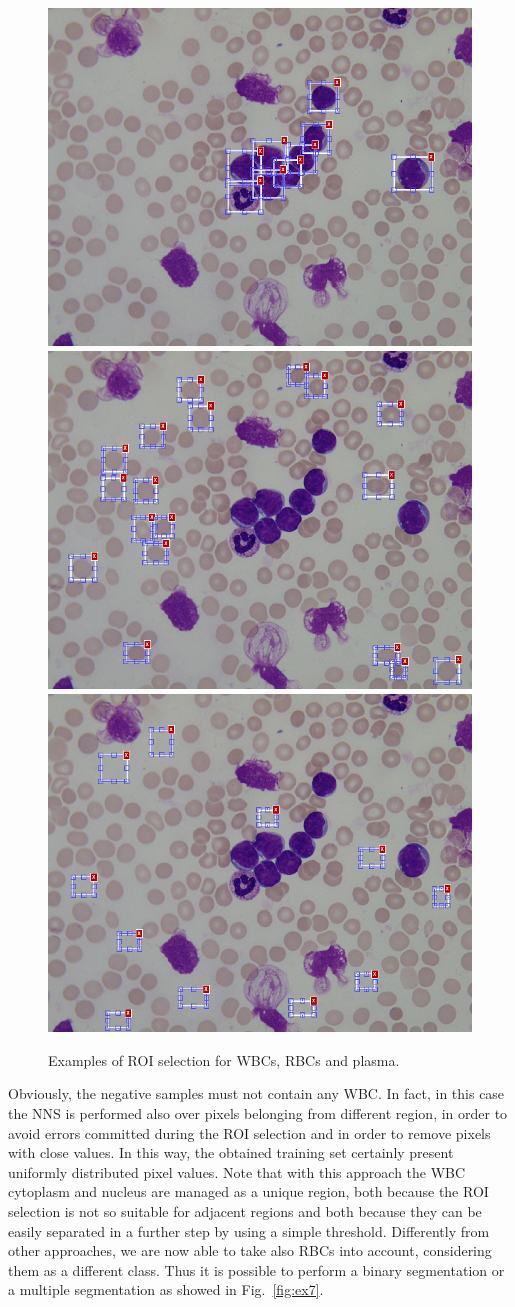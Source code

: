 \documentclass[final,a4paper,12pt,english]{UnicaPhdThesis3}
\begin{document}
\begin{figure}[!b]
	\centering
	\includegraphics[height=0.25\textwidth]{images/2015_1_caip/ROI1}
	\includegraphics[height=0.25\textwidth]{images/2015_1_caip/ROI2}
	\includegraphics[height=0.25\textwidth]{images/2015_1_caip/ROI3}
	\caption{\label{fig:ex6}Examples of ROI selection for WBCs, RBCs and plasma.}
\end{figure}

Obviously, the negative samples must not contain any WBC. In fact, in this case the NNS is performed also over pixels belonging from different region, in order to avoid errors committed during the ROI selection and in order to remove pixels with close values. In this way, the obtained training set certainly present uniformly distributed pixel values. Note that with this approach the WBC cytoplasm and nucleus are managed as a unique region, both because the ROI selection is not so suitable for adjacent regions and both because they can be easily separated in a further step by using a simple threshold. Differently from other approaches, we are now able to take also RBCs into account, considering them as a different class.
Thus it is possible to perform a binary segmentation or a multiple segmentation as showed in Fig.~\ref{fig:ex7}.
\end{document}
